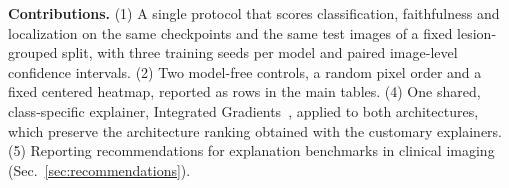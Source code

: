 \textbf{Contributions.} (1) A single protocol that scores classification, faithfulness and localization
on the same checkpoints and the same  test images of a fixed lesion-grouped split, with three
training seeds per model and paired image-level confidence intervals. (2) Two model-free controls, a
random pixel order and a fixed centered heatmap, reported as rows in the main tables.  (4) One shared, class-specific explainer, Integrated
Gradients~\cite{sundararajan2017axiomatic}, applied to both architectures, which 
preserve the architecture ranking obtained with the customary explainers.
(5) Reporting recommendations for explanation benchmarks in clinical imaging
(Sec.~\ref{sec:recommendations}).
